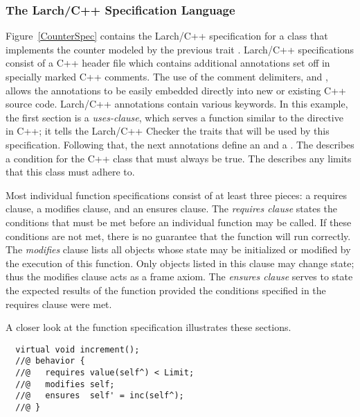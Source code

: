 \subsubsection{The Larch/C++ Specification Language}
\label{lcppbisl}
Figure~\ref{CounterSpec} contains the Larch/C++ specification
for a class that implements the counter modeled by the previous trait
\cite{Leavens96c}. Larch/C++ specifications consist of a C++ header
file which contains additional annotations set off in specially marked
C++ comments. The use of the comment delimiters,  and
, allows the annotations to be easily embedded
directly into new or existing C++ source code. Larch/C++ annotations contain various keywords. In this example, the first section is a
\emph{uses-clause}, which serves a function similar to the 
directive in C++; it tells the Larch/C++ Checker the traits that will
be used by this specification. Following that, the next annotations
define an  and a
. The
 describes a condition for the C++ class that must
always be true. The  describes any limits that
this class must adhere to. 

Most individual function specifications
consist of at least three pieces: a requires clause, a modifies
clause, and an ensures clause. The \emph{requires clause} states the
conditions that must be met before an individual function may be
called. If these conditions are not met, there is no guarantee that
the function will run correctly. The \emph{modifies} clause lists all
objects whose state may be initialized or modified by the execution of
this function. Only objects listed
in this clause may change state; thus the modifies clause acts as a
frame axiom. The \emph{ensures clause} serves to state the expected
results of the function provided the conditions specified in the
requires clause were met.

A closer look at the  function specification illustrates
these sections.
 

\begin{verbatim}
  virtual void increment();
  //@ behavior {
  //@   requires value(self^) < Limit;
  //@   modifies self;
  //@   ensures  self' = inc(self^);
  //@ }
\end{verbatim}


